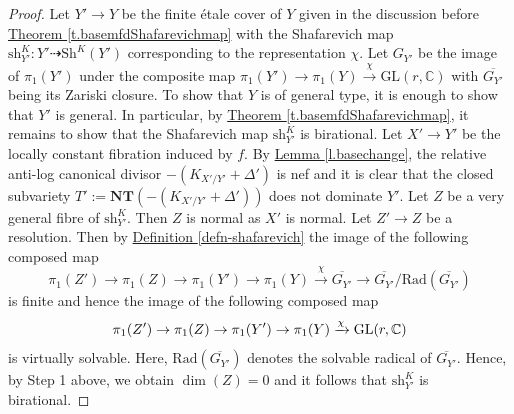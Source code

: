 \begin{proof}
    Let $Y'\rightarrow Y$ be the finite \'etale cover of $Y$ given in the discussion before {\hyperref[t.basemfdShafarevichmap]{Theorem  \ref*{t.basemfdShafarevichmap}}} with the Shafarevich map 
    $\text{sh}_{Y'}^K:Y'\dashrightarrow \text{Sh}^K(Y')$ corresponding to the representation $\chi$. 
    Let $G_{Y'}$ be the image of $\pi_1(Y')$ under the composite map $\pi_1(Y')\to\pi_1(Y)\xrightarrow{\chi} \text{GL}(r,\mathbb{C})$ with $\overline{G_{Y'}}$ being its Zariski closure. 
    To show that $Y$ is of general type, it is enough to show that $Y'$ is general. 
    In particular, by {\hyperref[t.basemfdShafarevichmap]{Theorem  \ref*{t.basemfdShafarevichmap}}}, it remains to show that the Shafarevich map $\text{sh}_{Y'}^K$ is birational. 
    Let $X'\rightarrow Y'$ be the locally constant fibration induced by $f$. 
    By {\hyperref[l.basechange]{Lemma \ref*{l.basechange}}}, the relative anti-log canonical divisor $-(K_{X'/Y'}+\Delta')$ is nef and it is clear that the closed subvariety $T':=\textbf{NT}(-(K_{X'/Y'}+\Delta'))$ does not dominate $Y'$. Let $Z$ be a very general fibre of $\text{sh}_{Y'}^K$. Then $Z$ is normal as $X'$ is normal. Let $Z'\rightarrow Z$ be a resolution. Then by {\hyperref[defn-shafarevich]{Definition \ref*{defn-shafarevich}}} the image of the following composed map
    \[
    \pi_1(Z')\rightarrow \pi_1(Z)\rightarrow \pi_1(Y') \rightarrow \pi_1(Y)\xrightarrow{\chi} \overline{G_{Y'}} \rightarrow \overline{G_{Y'}}/\text{Rad}(\overline{G_{Y'}})
    \]
    is finite and hence the image of the following composed map
    \[
    \pi_1(Z')\rightarrow \pi_1(Z)\rightarrow \pi_1(Y') \rightarrow \pi_1(Y)\xrightarrow{\chi} \textup{GL}(r,\mathbb{C})
    \]
    is virtually solvable. Here, $\text{Rad}(\overline{G_{Y'}})$ denotes the solvable radical of $\overline{G_{Y'}}$.
    Hence, by Step 1 above, we obtain $\dim(Z)=0$ and it follows that $\text{sh}_{Y'}^K$ is birational.
\end{proof}



